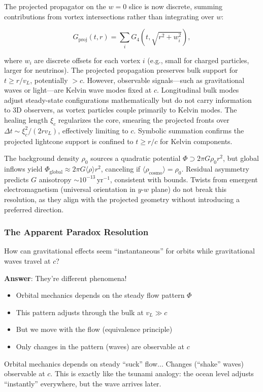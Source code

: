 The projected propagator on the $w=0$ slice is now discrete, summing contributions from vortex intersections rather than integrating over $w$:

\begin{equation}
G_{\text{proj}}(t, r) = \sum_i G_4(t, \sqrt{r^2 + w_i^2}),
\end{equation}

where $w_i$ are discrete offsets for each vortex $i$ (e.g., small for charged particles, larger for neutrinos). The projected propagation preserves bulk support for $t \geq r / v_L$, potentially $>c$. However, observable signals---such as gravitational waves or light---are Kelvin wave modes fixed at $c$. Longitudinal bulk modes adjust steady-state configurations mathematically but do not carry information to 3D observers, as vortex particles couple primarily to Kelvin modes. The healing length $\xi_c$ regularizes the core, smearing the projected fronts over $\Delta t \sim \xi_c^2 / (2 r v_L)$, effectively limiting to $c$. Symbolic summation confirms the projected lightcone support is confined to $t \geq r / c$ for Kelvin components.

The background density $\rho_0$ sources a quadratic potential $\Phi \supset 2\pi G \rho_0 r^2$, but global inflows yield $\Phi_{\text{global}} \approx 2\pi G \langle \rho \rangle r^2$, canceling if $\langle \rho_{\text{cosmo}} \rangle = \rho_0$. Residual asymmetry predicts $G$ anisotropy $\sim 10^{-13} \,\mathrm{yr}^{-1}$, consistent with bounds. Twists from emergent electromagnetism (universal orientation in $y$-$w$ plane) do not break this resolution, as they align with the projected geometry without introducing a preferred direction.

\subsubsection{The Apparent Paradox Resolution}

How can gravitational effects seem ``instantaneous'' for orbits while gravitational waves travel at $c$?

\textbf{Answer}: They're different phenomena!
\begin{itemize}
\item Orbital mechanics depends on the steady flow pattern $\Phi$
\item This pattern adjusts through the bulk at $v_L \gg c$
\item But we move with the flow (equivalence principle)
\item Only changes in the pattern (waves) are observable at $c$
\end{itemize}
Orbital mechanics depends on steady ``suck'' flow... Changes (``shake'' waves) observable at $c$. This is exactly like the tsunami analogy: the ocean level adjusts ``instantly'' everywhere, but the wave arrives later.

